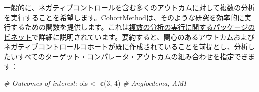\documentclass[
  11pt]{book}
\newenvironment{Shaded}{\begin{snugshade}}{\end{snugshade}}
\newcommand{\CommentTok}[1]{\textcolor[rgb]{0.56,0.35,0.01}{\textit{#1}}}
\newcommand{\DecValTok}[1]{\textcolor[rgb]{0.00,0.00,0.81}{#1}}
\newcommand{\FunctionTok}[1]{\textcolor[rgb]{0.13,0.29,0.53}{\textbf{#1}}}
\newcommand{\NormalTok}[1]{#1}
\newcommand{\OtherTok}[1]{\textcolor[rgb]{0.56,0.35,0.01}{#1}}
\theoremstyle{definition}
\theoremstyle{definition}
\theoremstyle{definition}
\theoremstyle{definition}
\theoremstyle{remark}
\begin{document}
一般的に、ネガティブコントロールを含む多くのアウトカムに対して複数の分析を実行することを希望します。\href{https://ohdsi.github.io/CohortMethod/}{CohortMethod}は、そのような研究を効率的に実行するための関数を提供します。これは\href{https://ohdsi.github.io/CohortMethod/articles/MultipleAnalyses.html}{複数の分析の実行に関するパッケージのビネット}で詳細に説明されています。要約すると、関心のあるアウトカムおよびネガティブコントロールコホートが既に作成されていることを前提とし、分析したいすべてのターゲット・コンパレータ・アウトカムの組み合わせを指定できます：

\begin{Shaded}
\begin{Highlighting}[]
\CommentTok{\# Outcomes of interest:}
\NormalTok{ois }\OtherTok{\textless{}{-}} \FunctionTok{c}\NormalTok{(}\DecValTok{3}\NormalTok{, }\DecValTok{4}\NormalTok{) }\CommentTok{\# Angioedema, AMI}


\end{Highlighting}
\end{Shaded}
\end{document}
